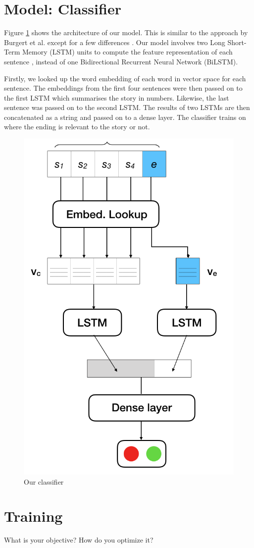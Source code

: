 \documentclass{article}
\begin{document}
\section{Model: Classifier}

Figure \ref{Figure:model} shows the architecture of our model. This is similar to the approach by Burgert et al. except for a few differences \cite{top4}. Our model involves two Long Short-Term Memory (LSTM) units to compute the feature representation of each sentence \citep{lstm}, instead of one Bidirectional Recurrent Neural Network (BiLSTM).

Firstly, we looked up the word embedding of each word in vector space for each sentence. The embeddings from the first four sentences were then passed on to the first LSTM which summarises the story in numbers. Likewise, the last sentence was passed on to the second LSTM. The results of two LSTMs are then concatenated as a string and passed on to a dense layer. The classifier trains on where the ending is relevant to the story or not.

\begin{figure}
  \centering
  \includegraphics[width=0.5 \linewidth]{fig/ourmodel.PNG}
  \caption{Our classifier}
  \label{Figure:model}
\end{figure}

\section{Training}
What is your objective? How do you optimize it?
\end{document}
